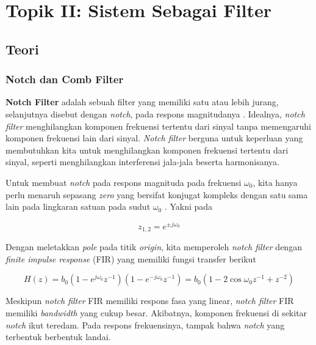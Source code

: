 \documentclass[11pt]{article}
\begin{document}


\section{Topik II: Sistem Sebagai Filter}\label{topik-ii}

\subsection{Teori}

\subsubsection{Notch dan Comb Filter}

\textbf{Notch Filter} adalah sebuah filter yang memiliki satu atau lebih jurang, selanjutnya disebut dengan \textit{notch}, pada respons magnitudanya \cite{oppenheim}. Idealnya, \textit{notch filter} menghilangkan komponen frekuensi tertentu dari sinyal tanpa memengaruhi komponen frekuensi lain dari sinyal. \textit{Notch filter} berguna untuk keperluan yang membutuhkan kita untuk menghilangkan komponen frekuensi tertentu dari sinyal, seperti menghilangkan interferensi jala-jala beserta harmonisanya.

Untuk membuat \textit{notch} pada respons magnituda pada frekuensi $\omega_0$, kita hanya perlu menaruh sepasang \textit{zero} yang bersifat konjugat kompleks dengan satu sama lain pada lingkaran satuan pada sudut $\omega_0$ \cite{oppenheim}. Yakni pada

\begin{equation}
    z_{1,2} = e^{\pm j \omega_0}
\end{equation}

Dengan meletakkan \textit{pole} pada titik \textit{origin}, kita memperoleh \textit{notch filter} dengan \textit{finite impulse response} (FIR) yang memiliki fungsi transfer berikut

\begin{equation}
    H(z) = b_0 (1 - e^{j \omega_0} z^{-1}) (1 - e^{-j \omega_0} z^{-1})
    = b_0 (1 - 2 \cos{\omega_0 z^{-1}} + z^{-2})
\end{equation}

Meskipun \textit{notch filter} FIR memiliki respons fasa yang linear, \textit{notch filter} FIR memiliki \textit{bandwidth} yang cukup besar. Akibatnya, komponen frekuensi di sekitar \textit{notch} ikut teredam. Pada respons frekuensinya, tampak bahwa \textit{notch} yang terbentuk berbentuk landai.
\end{document}
